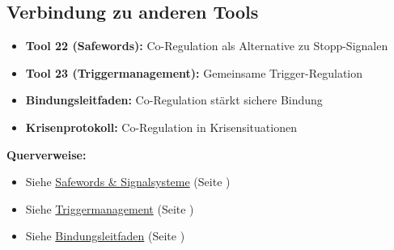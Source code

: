 
\subsection{Verbindung zu anderen Tools}

\begin{itemize}
    \item \textbf{Tool 22 (Safewords):} Co-Regulation als Alternative zu Stopp-Signalen
    \item \textbf{Tool 23 (Triggermanagement):} Gemeinsame Trigger-Regulation  
    \item \textbf{Bindungsleitfaden:} Co-Regulation stärkt sichere Bindung
    \item \textbf{Krisenprotokoll:} Co-Regulation in Krisensituationen
\end{itemize}

\textbf{Querverweise:}
\begin{itemize}
    \item Siehe \hyperref[sec:safewords]{Safewords \& Signalsysteme} (Seite \pageref{sec:safewords})
    \item Siehe \hyperref[sec:triggermanagement]{Triggermanagement} (Seite \pageref{sec:triggermanagement})
    \item Siehe \hyperref[sec:bindung]{Bindungsleitfaden} (Seite \pageref{sec:bindung})
\end{itemize}

\newpage
